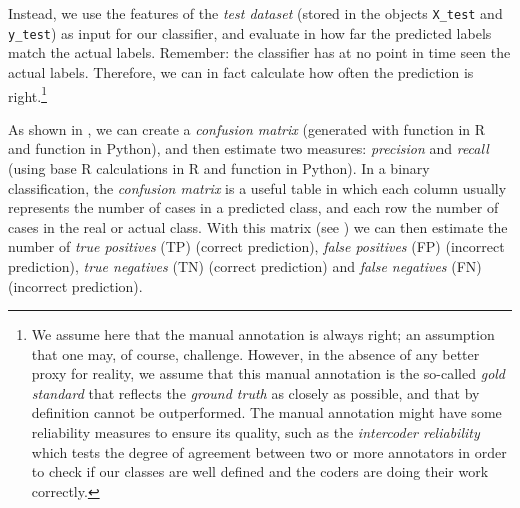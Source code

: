 Instead, we use the features of the \emph{test dataset} (stored in the objects  \texttt{X\_test} and \texttt{y\_test})  as input for
our classifier, and evaluate in how far the predicted labels match the
actual labels.  Remember: the classifier has at no point in time seen
the actual labels.  Therefore, we can in fact calculate how often the
prediction is right.\footnote{We assume here that the manual annotation
  is always right; an assumption that one may, of course,
  challenge. However, in the absence of any better proxy for reality,
  we assume that this manual annotation is the so-called \emph{gold
    standard} that reflects the \emph{ground truth} as closely as
  possible, and that by definition cannot be outperformed. The manual annotation might have some reliability measures to ensure its quality, such as the \emph{intercoder reliability} which tests the degree of agreement between two or more annotators in order to check if our classes are well defined and the coders are doing their work correctly.}


As shown in , we can create a \emph{confusion matrix} (generated with  function  in R and  function  in Python), and then estimate two measures: \emph{precision} and \emph{recall} (using base R calculations in R and  function  in Python). In a binary classification, the \emph{confusion matrix} is a useful table in which each column usually represents the number of cases in a predicted class, and each row the number of cases in the real or actual class. With this matrix (see ) we can then estimate the number of \emph{true positives} (TP) (correct prediction), \emph{false positives} (FP) (incorrect prediction), \emph{true negatives} (TN) (correct prediction) and \emph{false negatives} (FN) (incorrect prediction).


